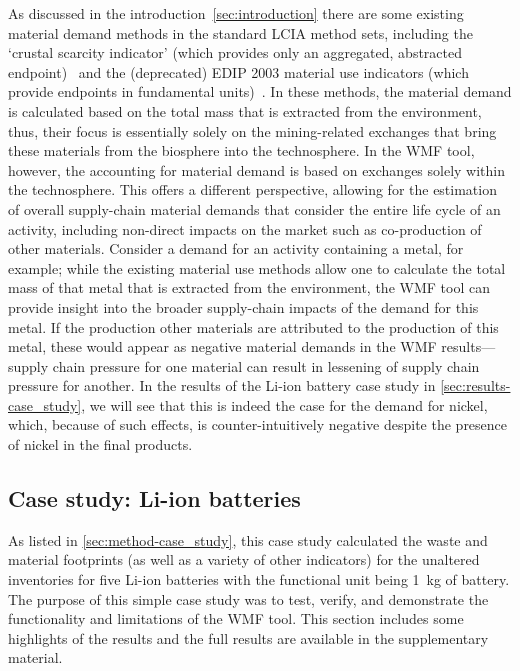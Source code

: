 As discussed in the introduction~\ref{sec:introduction} there are some existing material demand methods in the standard LCIA method sets, including the `crustal scarcity indicator' (which provides only an aggregated, abstracted endpoint)~\citep{arvidsson2020csi} and the (deprecated) EDIP 2003 material use indicators (which provide endpoints in fundamental units)~\citep{hauschild2003edip}. In these methods, the material demand is calculated based on the total mass that is extracted from the environment, thus, their focus is essentially solely on the mining-related exchanges that bring these materials from the biosphere into the technosphere. In the WMF tool, however, the accounting for material demand is based on exchanges solely within the technosphere. This offers a different perspective, allowing for the estimation of overall supply-chain material demands that consider the entire life cycle of an activity, including non-direct impacts on the market such as co-production of other materials. Consider a demand for an activity containing a metal, for example; while the existing material use methods allow one to calculate the total mass of that metal that is extracted from the environment, the WMF tool can provide insight into the broader supply-chain impacts of the demand for this metal. If the production other materials are attributed to the production of this metal, these would appear as negative material demands in the WMF results---supply chain pressure for one material can result in lessening of supply chain pressure for another. In the results of the Li-ion battery case study in \autoref{sec:results-case_study}, we will see that this is indeed the case for the demand for nickel, which, because of such effects, is counter-intuitively negative despite the presence of nickel in the final products.


\subsection{Case study: Li-ion batteries}\label{sec:results-case_study}


As listed in \autoref{sec:method-case_study}, this case study calculated the waste and material footprints (as well as a variety of other indicators) for the unaltered inventories for five Li-ion batteries with the functional unit being 1~kg of battery. The purpose of this simple case study was to test, verify, and demonstrate the functionality and limitations of the WMF tool. This section includes some highlights of the results and the full results are available in the supplementary material.

